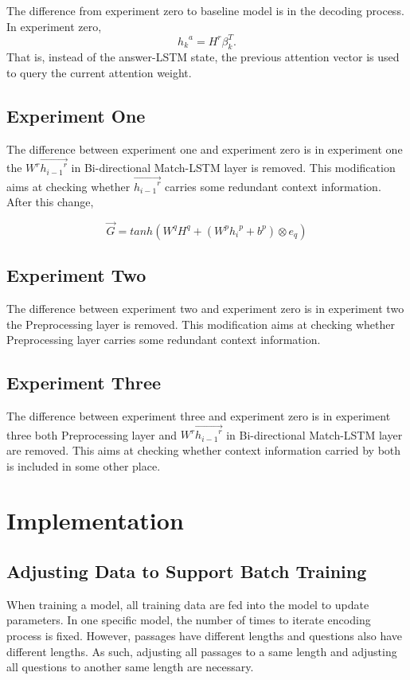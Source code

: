 \documentclass[modernstyle,12pt]{sjsuthesis}
\theoremstyle{definition}
\begin{document}
The difference from experiment zero to baseline model is in the decoding process. In experiment zero,
$${h_k}^a = H^r\beta _{k}^T.$$
That is, instead of the answer-LSTM state, the previous attention vector is used to query the current attention weight.

\section{Experiment One}

The difference between experiment one and experiment zero is in experiment one the $W^r\overrightarrow{{h_{i-1}}^r}$ in Bi-directional Match-LSTM layer is removed. This modification aims at checking whether $\overrightarrow{{h_{i-1}}^r}$ carries some redundant context information. After this change,


$$\overrightarrow{G} = tanh(W^qH^q + (W^p{h_i}^p + b^p) \otimes e_q)$$


\section{Experiment Two}

The difference between experiment two and experiment zero is in experiment two the Preprocessing layer is removed. This modification aims at checking whether Preprocessing layer carries some redundant context information.

\section{Experiment Three}

The difference between experiment three and experiment zero is in experiment three both Preprocessing layer and $W^r\overrightarrow{{h_{i-1}}^r}$ in Bi-directional Match-LSTM layer are removed. This aims at checking whether context information carried by both is included in some other place.

\chapter{Implementation}

\section{Adjusting Data to Support Batch Training}\label{sect:padding}

When training a model, all training data are fed into the model to update parameters. In one specific model, the number of times to iterate encoding process is fixed. However, passages have different lengths and questions also have different lengths. As such, adjusting all passages to a same length and adjusting all questions to another same length are necessary.
\end{document}

